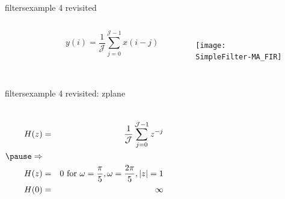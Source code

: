 	\begin{frame}{filters}{example 4 revisited}
        \vspace{-5mm}
        \begin{columns}
	        \begin{figure}
				\begin{center}
                
				\end{center}
	        \end{figure}
        
            \begin{equation*}
        		y(i) = \frac{1}{\mathcal{J}}\sum\limits_{j=0}^{\mathcal{J}-1}{x(i-j)}
        	\end{equation*}
            \begin{figure}
                \centerline{\texttt{[image: SimpleFilter-MA\_FIR]}}
            \end{figure}
        \end{columns}
	\end{frame}	
	
	
	\begin{frame}{filters}{example 4 revisited: zplane}
        \vspace{-5mm}
        \begin{columns}
            \begin{eqnarray*}
                H(z) &=& \frac{1}{\mathcal{J}}\sum\limits_{j=0}^{\mathcal{J}-1}{z^{-j}}\\
               \bigskip
                \pause
            \Rightarrow&&\\
            H(z) &=& 0\text{ for }\omega = \frac{\pi}{5}, \omega = \frac{2\pi}{5}, |z|=1\\
            H(0) &=& \infty
            \end{eqnarray*}
        \end{columns}
	\end{frame}	
	
